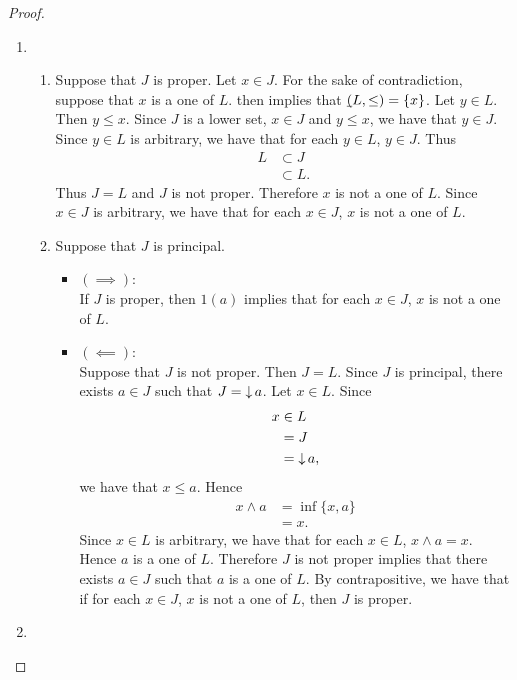 \documentclass{book}
\begin{document}
	\begin{proof}\
		\begin{enumerate}
			\item 
			\begin{enumerate}
				\item Suppose that $J$ is proper. Let $x \in J$. For the sake of contradiction, suppose that $x$ is a one of $L$.  then implies that $\underbar{(}L, \leq) = \{x\}$. Let $y \in L$. Then $y \leq x$. Since $J$ is a lower set, $x \in J$ and $y \leq x$, we have that $y \in J$. Since $y \in L$ is arbitrary, we have that for each $y \in L$, $y \in J$. Thus 
				\begin{align*}
					L 
					& \subset J \\
					& \subset L.
				\end{align*}
				Thus $J = L$ and $J$ is not proper. Therefore $x$ is not a one of $L$. Since $x \in J$ is arbitrary, we have that for each $x \in J$, $x$ is not a one of $L$. 
				\item Suppose that $J$ is principal. 
				\begin{itemize}
					\item $(\implies)$: \\
					If $J$ is proper, then $1(a)$ implies that for each $x \in J$, $x$ is not a one of $L$.
					\item $(\impliedby)$: \\
					Suppose that $J$ is not proper. Then $J = L$. Since $J$ is principal, there exists $a \in J$ such that $J = \operatorname{\downarrow} a$. Let $x \in L$. Since
					\begin{align*}
						x
						& \in L \\
						& = J \\
						& = \operatorname{\downarrow} a,
					\end{align*} 
					we have that $x \leq a$. Hence 
					\begin{align*}
						x \wedge a
						& = \inf \{x, a\} \\
						& = x.
					\end{align*}
					Since $x \in L$ is arbitrary, we have that for each $x \in L$, $x \wedge a = x$. Hence $a$ is a one of $L$. Therefore $J$ is not proper implies that there exists $a \in J$ such that $a$ is a one of $L$. By contrapositive, we have that if for each $x \in J$, $x$ is not a one of $L$, then $J$ is proper. 
				\end{itemize}
			\end{enumerate}
			\item {}
		\end{enumerate}
	\end{proof}
	
\end{document}
